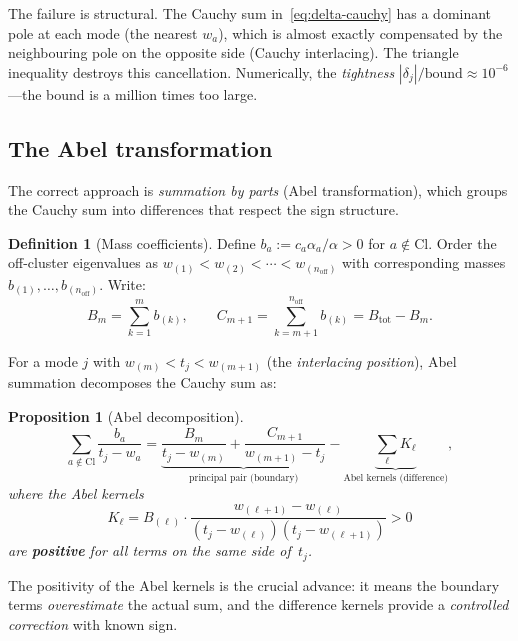 \documentclass[12pt,a4paper]{article}
\newtheorem{proposition}[theorem]{Proposition}
\theoremstyle{definition}
\newtheorem{definition}[theorem]{Definition}
\theoremstyle{remark}
\newcommand{\Cl}{\mathrm{Cl}}
\newcommand{\off}{\mathrm{off}}
\begin{document}
The failure is structural.
The Cauchy sum in~\eqref{eq:delta-cauchy} has a dominant pole at
each mode (the nearest $w_a$), which is almost exactly compensated
by the neighbouring pole on the opposite side (Cauchy interlacing).
The triangle inequality destroys this cancellation.
Numerically, the \emph{tightness}
$|\delta_j|/\text{bound} \approx 10^{-6}$---the bound is a million times
too large.

\subsection{The Abel transformation}

The correct approach is \emph{summation by parts} (Abel transformation),
which groups the Cauchy sum into differences that respect the sign
structure.

\begin{definition}[Mass coefficients]
Define $b_a := c_a \alpha_a / \alpha > 0$ for $a \notin \Cl$.
Order the off-cluster eigenvalues as $w_{(1)} < w_{(2)} < \cdots < w_{(n_{\off})}$
with corresponding masses $b_{(1)}, \ldots, b_{(n_{\off})}$.
Write:
\begin{equation}
B_m = \sum_{k=1}^{m} b_{(k)}, \qquad
C_{m+1} = \sum_{k=m+1}^{n_{\off}} b_{(k)} = B_{\mathrm{tot}} - B_m.
\end{equation}
\end{definition}

For a mode $j$ with $w_{(m)} < t_j < w_{(m+1)}$ (the \emph{interlacing
position}), Abel summation decomposes the Cauchy sum as:

\begin{proposition}[Abel decomposition]
\label{prop:abel}
\begin{equation}
\label{eq:abel}
\sum_{a \notin \Cl} \frac{b_a}{t_j - w_a}
= \underbrace{\frac{B_m}{t_j - w_{(m)}} + \frac{C_{m+1}}{w_{(m+1)} - t_j}}_{\text{principal pair (boundary)}}
- \underbrace{\sum_{\ell} K_\ell}_{\text{Abel kernels (difference)}},
\end{equation}
where the Abel kernels
\begin{equation}
K_\ell = B_{(\ell)} \cdot \frac{w_{(\ell+1)} - w_{(\ell)}}{(t_j - w_{(\ell)})(t_j - w_{(\ell+1)})} > 0
\end{equation}
are \textbf{positive} for all terms on the same side of~$t_j$.
\end{proposition}

The positivity of the Abel kernels is the crucial advance:
it means the boundary terms \emph{overestimate} the actual sum,
and the difference kernels provide a \emph{controlled correction}
with known sign.
\end{document}
